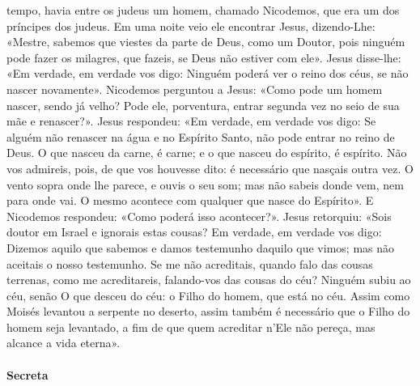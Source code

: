 \begin{paracol}{2}
{ tempo, havia entre os judeus um homem, chamado Nicodemos, que era um dos príncipes dos judeus. Em uma noite veio ele encontrar Jesus, dizendo-Lhe: «Mestre, sabemos que viestes da parte de Deus, como um Doutor, pois ninguém pode fazer os milagres, que fazeis, se Deus não estiver com ele». Jesus disse-lhe: «Em verdade, em verdade vos digo: Ninguém poderá ver o reino dos céus, se não nascer novamente». Nicodemos perguntou a Jesus: «Como pode um homem nascer, sendo já velho? Pode ele, porventura, entrar segunda vez no seio de sua mãe e renascer?». Jesus respondeu: «Em verdade, em verdade vos digo: Se alguém não renascer na água e no Espírito Santo, não pode entrar no reino de Deus. O que nasceu da carne, é carne; e o que nasceu do espírito, é espírito. Não vos admireis, pois, de que vos houvesse dito: é necessário que nasçais outra vez. O vento sopra onde lhe parece, e ouvis o seu som; mas não sabeis donde vem, nem para onde vai. O mesmo acontece com qualquer que nasce do Espírito». E Nicodemos respondeu: «Como poderá isso acontecer?». Jesus retorquiu: «Sois doutor em Israel e ignorais estas cousas? Em verdade, em verdade vos digo: Dizemos aquilo que sabemos e damos testemunho daquilo que vimos; mas não aceitais o nosso testemunho. Se me não acreditais, quando falo das cousas terrenas, como me acreditareis, falando-vos das cousas do céu? Ninguém subiu ao céu, senão O que desceu do céu: o Filho do homem, que está no céu. Assim como Moisés levantou a serpente no deserto, assim também é necessário que o Filho do homem seja levantado, a fim de que quem acreditar n’Ele não pereça, mas alcance a vida eterna».
}\end{paracol}

\begin{paracol}{2}\switchcolumn{}\end{paracol}

\paragraph{Secreta}
\begin{paracol}{2}\switchcolumn{}\end{paracol}


